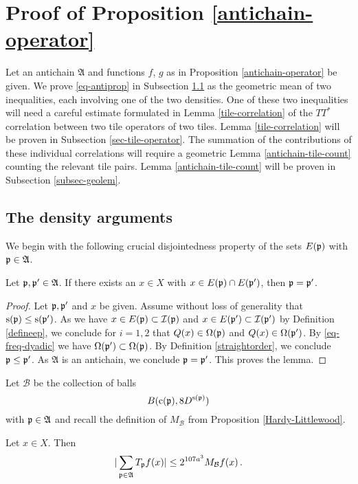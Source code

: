 {\chapter{Proof of  Proposition \ref{antichain-operator}}

\label{antichainboundary}

Let an antichain $\mathfrak{A}$
and functions $f$, $g$ as in Proposition \ref{antichain-operator} be given.
We prove \eqref{eq-antiprop}
in Subsection \ref{sec-TT*-T*T}
as the geometric mean of two inequalities,
each involving one of the two densities.
One of these two inequalities will need a careful estimate formulated in
Lemma \ref{tile-correlation} of
the $TT^*$ correlation between two tile operators of two tiles.
Lemma \ref{tile-correlation} will be proven in
Subsection \ref{sec-tile-operator}.
The summation of the contributions of these individual correlations will require a
geometric Lemma \ref{antichain-tile-count} counting the relevant tile pairs.
Lemma \ref{antichain-tile-count} will be proven in Subsection
\ref{subsec-geolem}.






\section{The density  arguments}\label{sec-TT*-T*T}

We begin with the following crucial disjointedness property of the sets $E({\mathfrak p})$ with ${\mathfrak p} \in \mathfrak{A}$.
\begin{lemma}
\label{tile-disjointness}
Let ${\mathfrak p},{\mathfrak p}'\in \mathfrak{A}$.
If there exists an $x\in X$ with $x\in  E({\mathfrak p})\cap E({\mathfrak p}')$,
then ${\mathfrak p}= {\mathfrak p}'$.
\end{lemma}
\begin{proof}
Let ${\mathfrak p},{\mathfrak p}'$ and $x$ be given.
Assume without loss of generality that ${\mathrm{s}}({\mathfrak p})\le {\mathrm{s}}({\mathfrak p}')$.
As we have $x\in E({\mathfrak p})\subset {\mathcal{I}}({\mathfrak p})$  and $x\in E({\mathfrak p}')\subset {\mathcal{I}}({\mathfrak p}')$ by Definition \eqref{defineep}, we conclude
for $i=1,2$ that
${Q}(x)\in{\Omega}({\mathfrak p})$ and ${Q}(x)\in{\Omega}({\mathfrak p}')$. By \eqref{eq-freq-dyadic} we have ${\Omega}({\mathfrak p}')\subset {\Omega}({\mathfrak p})$. By Definition
\eqref{straightorder}, we conclude ${\mathfrak p}\le {\mathfrak p}'$. As $\mathfrak{A}$ is an antichain, we conclude ${\mathfrak p}={\mathfrak p}'$.
This proves the lemma.
\end{proof}



Let $\mathcal{B}$ be the collection of balls
\begin{equation}
    B({\mathrm{c}}({\mathfrak p}), 8D^{{\mathrm{s}}({\mathfrak p})})
\end{equation}
with ${\mathfrak p}\in \mathfrak{A}$ and recall the definition of
$M_{\mathcal{B}}$ from Proposition \ref{Hardy-Littlewood}.
\begin{lemma}\label{maximal-bound-antichain}
Let $x\in X$.
Then
\begin{equation}\label{hlmbound}
  | \sum_{{\mathfrak p} \in \mathfrak{A}}T_{{\mathfrak p}} f(x)|\le 2^{107 a^3} M_{\mathcal{B}} f (x) \, .
\end{equation}
\end{lemma}



}
